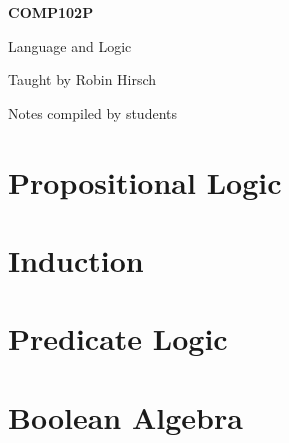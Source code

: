 \documentclass[12pt,a4paper]{report}
\begin{document}
    \begin{titlepage}
        \centering
        \bfseries
        \LARGE \textsc{COMP102P}\par
        \vspace{1cm}
        \Huge Language and Logic\par
        \vspace{1cm}
        \Large Taught by Robin Hirsch\par
        \vspace{1cm}
        \Large Notes compiled by students
    \end{titlepage}

    \chapter{Propositional Logic}
    

    \chapter{Induction}
    

    \chapter{Predicate Logic}
    

    \chapter{Boolean Algebra}
    

    \glsaddall
    \clearpage
    \printglossaries
\end{document}
